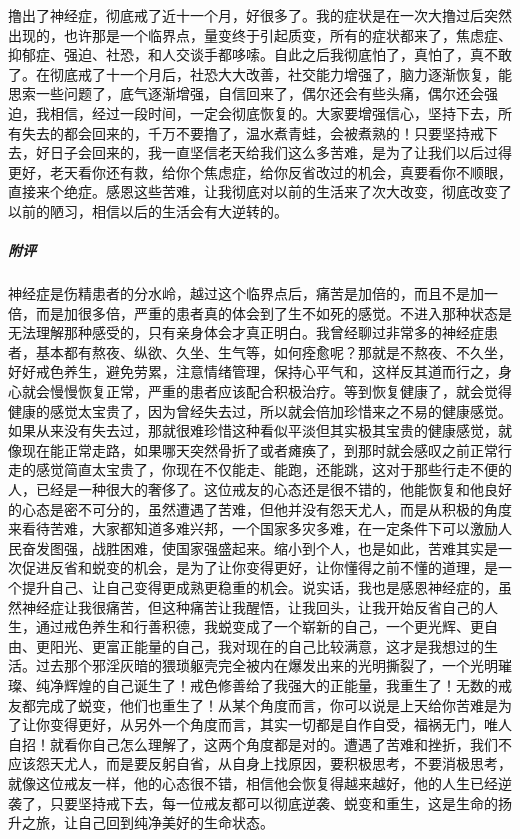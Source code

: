 \begin{case}
    撸出了神经症，彻底戒了近十一个月，好很多了。我的症状是在一次大撸过后突然出现的，也许那是一个临界点，量变终于引起质变，所有的症状都来了，焦虑症、抑郁症、强迫、社恐，和人交谈手都哆嗦。自此之后我彻底怕了，真怕了，真不敢了。在彻底戒了十一个月后，社恐大大改善，社交能力增强了，脑力逐渐恢复，能思索一些问题了，底气逐渐增强，自信回来了，偶尔还会有些头痛，偶尔还会强迫，我相信，经过一段时间，一定会彻底恢复的。大家要增强信心，坚持下去，所有失去的都会回来的，千万不要撸了，温水煮青蛙，会被煮熟的！只要坚持戒下去，好日子会回来的，我一直坚信老天给我们这么多苦难，是为了让我们以后过得更好，老天看你还有救，给你个焦虑症，给你反省改过的机会，真要看你不顺眼，直接来个绝症。感恩这些苦难，让我彻底对以前的生活来了次大改变，彻底改变了以前的陋习，相信以后的生活会有大逆转的。
    \subparagraph{附评} 神经症是伤精患者的分水岭，越过这个临界点后，痛苦是加倍的，而且不是加一倍，而是加很多倍，严重的患者真的体会到了生不如死的感觉。不进入那种状态是无法理解那种感受的，只有亲身体会才真正明白。我曾经聊过非常多的神经症患者，基本都有熬夜、纵欲、久坐、生气等，如何痊愈呢？那就是不熬夜、不久坐，好好戒色养生，避免劳累，注意情绪管理，保持心平气和，这样反其道而行之，身心就会慢慢恢复正常，严重的患者应该配合积极治疗。等到恢复健康了，就会觉得健康的感觉太宝贵了，因为曾经失去过，所以就会倍加珍惜来之不易的健康感觉。如果从来没有失去过，那就很难珍惜这种看似平淡但其实极其宝贵的健康感觉，就像现在能正常走路，如果哪天突然骨折了或者瘫痪了，到那时就会感叹之前正常行走的感觉简直太宝贵了，你现在不仅能走、能跑，还能跳，这对于那些行走不便的人，已经是一种很大的奢侈了。这位戒友的心态还是很不错的，他能恢复和他良好的心态是密不可分的，虽然遭遇了苦难，但他并没有怨天尤人，而是从积极的角度来看待苦难，大家都知道多难兴邦，一个国家多灾多难，在一定条件下可以激励人民奋发图强，战胜困难，使国家强盛起来。缩小到个人，也是如此，苦难其实是一次促进反省和蜕变的机会，是为了让你变得更好，让你懂得之前不懂的道理，是一个提升自己、让自己变得更成熟更稳重的机会。说实话，我也是感恩神经症的，虽然神经症让我很痛苦，但这种痛苦让我醒悟，让我回头，让我开始反省自己的人生，通过戒色养生和行善积德，我蜕变成了一个崭新的自己，一个更光辉、更自由、更阳光、更富正能量的自己，我对现在的自己比较满意，这才是我想过的生活。过去那个邪淫灰暗的猥琐躯壳完全被内在爆发出来的光明撕裂了，一个光明璀璨、纯净辉煌的自己诞生了！戒色修善给了我强大的正能量，我重生了！无数的戒友都完成了蜕变，他们也重生了！从某个角度而言，你可以说是上天给你苦难是为了让你变得更好，从另外一个角度而言，其实一切都是自作自受，福祸无门，唯人自招！就看你自己怎么理解了，这两个角度都是对的。遭遇了苦难和挫折，我们不应该怨天尤人，而是要反躬自省，从自身上找原因，要积极思考，不要消极思考，就像这位戒友一样，他的心态很不错，相信他会恢复得越来越好，他的人生已经逆袭了，只要坚持戒下去，每一位戒友都可以彻底逆袭、蜕变和重生，这是生命的扬升之旅，让自己回到纯净美好的生命状态。
\end{case}

